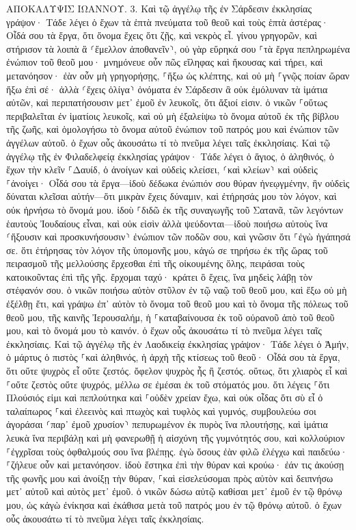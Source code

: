 \documentclass[twoside, 9pt]{extreport}
\begin{document}
ΑΠΟΚΑΛΥΨΙΣ ΙΩΑΝΝΟΥ.
3.
Καὶ τῷ ἀγγέλῳ τῆς ἐν Σάρδεσιν ἐκκλησίας γράψον· Τάδε λέγει ὁ ἔχων τὰ ἑπτὰ πνεύματα τοῦ θεοῦ καὶ τοὺς ἑπτὰ ἀστέρας· Οἶδά σου τὰ ἔργα, ὅτι ὄνομα ἔχεις ὅτι ζῇς, καὶ νεκρὸς εἶ. 
γίνου γρηγορῶν, καὶ στήρισον τὰ λοιπὰ ἃ ⸂ἔμελλον ἀποθανεῖν⸃, οὐ γὰρ εὕρηκά σου ⸀τὰ ἔργα πεπληρωμένα ἐνώπιον τοῦ θεοῦ μου· 
μνημόνευε οὖν πῶς εἴληφας καὶ ἤκουσας καὶ τήρει, καὶ μετανόησον· ἐὰν οὖν μὴ γρηγορήσῃς, ⸀ἥξω ὡς κλέπτης, καὶ οὐ μὴ ⸀γνῷς ποίαν ὥραν ἥξω ἐπὶ σέ· 
ἀλλὰ ⸂ἔχεις ὀλίγα⸃ ὀνόματα ἐν Σάρδεσιν ἃ οὐκ ἐμόλυναν τὰ ἱμάτια αὐτῶν, καὶ περιπατήσουσιν μετ᾽ ἐμοῦ ἐν λευκοῖς, ὅτι ἄξιοί εἰσιν. 
ὁ νικῶν ⸀οὕτως περιβαλεῖται ἐν ἱματίοις λευκοῖς, καὶ οὐ μὴ ἐξαλείψω τὸ ὄνομα αὐτοῦ ἐκ τῆς βίβλου τῆς ζωῆς, καὶ ὁμολογήσω τὸ ὄνομα αὐτοῦ ἐνώπιον τοῦ πατρός μου καὶ ἐνώπιον τῶν ἀγγέλων αὐτοῦ. 
ὁ ἔχων οὖς ἀκουσάτω τί τὸ πνεῦμα λέγει ταῖς ἐκκλησίαις. 
Καὶ τῷ ἀγγέλῳ τῆς ἐν Φιλαδελφείᾳ ἐκκλησίας γράψον· Τάδε λέγει ὁ ἅγιος, ὁ ἀληθινός, ὁ ἔχων τὴν κλεῖν ⸀Δαυίδ, ὁ ἀνοίγων καὶ οὐδεὶς κλείσει, ⸂καὶ κλείων⸃ καὶ οὐδεὶς ⸀ἀνοίγει· 
Οἶδά σου τὰ ἔργα—ἰδοὺ δέδωκα ἐνώπιόν σου θύραν ἠνεῳγμένην, ἣν οὐδεὶς δύναται κλεῖσαι αὐτήν—ὅτι μικρὰν ἔχεις δύναμιν, καὶ ἐτήρησάς μου τὸν λόγον, καὶ οὐκ ἠρνήσω τὸ ὄνομά μου. 
ἰδοὺ ⸀διδῶ ἐκ τῆς συναγωγῆς τοῦ Σατανᾶ, τῶν λεγόντων ἑαυτοὺς Ἰουδαίους εἶναι, καὶ οὐκ εἰσὶν ἀλλὰ ψεύδονται—ἰδοὺ ποιήσω αὐτοὺς ἵνα ⸂ἥξουσιν καὶ προσκυνήσουσιν⸃ ἐνώπιον τῶν ποδῶν σου, καὶ γνῶσιν ὅτι ⸀ἐγὼ ἠγάπησά σε. 
ὅτι ἐτήρησας τὸν λόγον τῆς ὑπομονῆς μου, κἀγώ σε τηρήσω ἐκ τῆς ὥρας τοῦ πειρασμοῦ τῆς μελλούσης ἔρχεσθαι ἐπὶ τῆς οἰκουμένης ὅλης, πειράσαι τοὺς κατοικοῦντας ἐπὶ τῆς γῆς. 
ἔρχομαι ταχύ· κράτει ὃ ἔχεις, ἵνα μηδεὶς λάβῃ τὸν στέφανόν σου. 
ὁ νικῶν ποιήσω αὐτὸν στῦλον ἐν τῷ ναῷ τοῦ θεοῦ μου, καὶ ἔξω οὐ μὴ ἐξέλθῃ ἔτι, καὶ γράψω ἐπ᾽ αὐτὸν τὸ ὄνομα τοῦ θεοῦ μου καὶ τὸ ὄνομα τῆς πόλεως τοῦ θεοῦ μου, τῆς καινῆς Ἰερουσαλήμ, ἡ ⸀καταβαίνουσα ἐκ τοῦ οὐρανοῦ ἀπὸ τοῦ θεοῦ μου, καὶ τὸ ὄνομά μου τὸ καινόν. 
ὁ ἔχων οὖς ἀκουσάτω τί τὸ πνεῦμα λέγει ταῖς ἐκκλησίαις. 
Καὶ τῷ ἀγγέλῳ τῆς ἐν Λαοδικείᾳ ἐκκλησίας γράψον· Τάδε λέγει ὁ Ἀμήν, ὁ μάρτυς ὁ πιστὸς ⸀καὶ ἀληθινός, ἡ ἀρχὴ τῆς κτίσεως τοῦ θεοῦ· 
Οἶδά σου τὰ ἔργα, ὅτι οὔτε ψυχρὸς εἶ οὔτε ζεστός. ὄφελον ψυχρὸς ἦς ἢ ζεστός. 
οὕτως, ὅτι χλιαρὸς εἶ καὶ ⸀οὔτε ζεστὸς οὔτε ψυχρός, μέλλω σε ἐμέσαι ἐκ τοῦ στόματός μου. 
ὅτι λέγεις ⸀ὅτι Πλούσιός εἰμι καὶ πεπλούτηκα καὶ ⸀οὐδὲν χρείαν ἔχω, καὶ οὐκ οἶδας ὅτι σὺ εἶ ὁ ταλαίπωρος ⸀καὶ ἐλεεινὸς καὶ πτωχὸς καὶ τυφλὸς καὶ γυμνός, 
συμβουλεύω σοι ἀγοράσαι ⸂παρ᾽ ἐμοῦ χρυσίον⸃ πεπυρωμένον ἐκ πυρὸς ἵνα πλουτήσῃς, καὶ ἱμάτια λευκὰ ἵνα περιβάλῃ καὶ μὴ φανερωθῇ ἡ αἰσχύνη τῆς γυμνότητός σου, καὶ κολλούριον ⸀ἐγχρῖσαι τοὺς ὀφθαλμούς σου ἵνα βλέπῃς. 
ἐγὼ ὅσους ἐὰν φιλῶ ἐλέγχω καὶ παιδεύω· ⸀ζήλευε οὖν καὶ μετανόησον. 
ἰδοὺ ἕστηκα ἐπὶ τὴν θύραν καὶ κρούω· ἐάν τις ἀκούσῃ τῆς φωνῆς μου καὶ ἀνοίξῃ τὴν θύραν, ⸀καὶ εἰσελεύσομαι πρὸς αὐτὸν καὶ δειπνήσω μετ᾽ αὐτοῦ καὶ αὐτὸς μετ᾽ ἐμοῦ. 
ὁ νικῶν δώσω αὐτῷ καθίσαι μετ᾽ ἐμοῦ ἐν τῷ θρόνῳ μου, ὡς κἀγὼ ἐνίκησα καὶ ἐκάθισα μετὰ τοῦ πατρός μου ἐν τῷ θρόνῳ αὐτοῦ. 
ὁ ἔχων οὖς ἀκουσάτω τί τὸ πνεῦμα λέγει ταῖς ἐκκλησίαις. 
\end{document}
